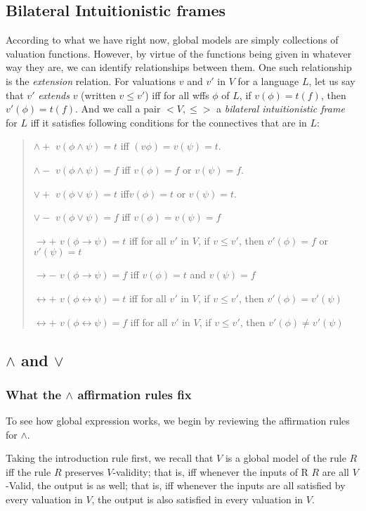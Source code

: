 \documentclass[]{article}
\begin{document}
\subsection{Bilateral Intuitionistic frames}
According to what we have right now, global models are simply collections of valuation functions. However, by virtue of the functions being given in whatever way they are, we can identify relationships between them. One such relationship is the \textit{extension} relation. For valuations $v$ and $v'$ in $V$ for a language $L$, let us say that $v'$ \textit{extends} $v$ (written $v\leq v'$) iff for all wffs $\phi$ of $L$, if $v(\phi) = t (f)$, then $v'(\phi) = t (f)$. And we call a pair $<V, \leq>$ a \textit{bilateral intuitionistic frame} for $L$ iff it satisfies following conditions for the connectives that are in $L$:

\begin{quote}
$\wedge+$ $v(\phi\wedge\psi) = t$ iff $(v\phi) = v(\psi) = t$.

$\wedge-$ $v(\phi\wedge\psi) = f$ iff $v(\phi) = f$ or $v(\psi) = f$.

$\vee+$ $v(\phi\vee\psi) = t$ iff$ v(\phi) = t$ or $v(\psi) = t$.

$\vee-$ $v(\phi\vee\psi) = f$ iff $v(\phi) = v(\psi) =f$

$\rightarrow+$ $v(\phi\rightarrow\psi) = t$ iff for all $v'$ in $V$, if $v\leq v'$, then $v'(\phi) = f$ or $v'(\psi) = t$

$\rightarrow-$ $v(\phi\rightarrow\psi) = f$ iff $v(\phi) = t$ and $v(\psi) = f$

$\leftrightarrow+$ $v(\phi\leftrightarrow\psi) = t$ iff for all $v'$ in $V$, if $v\leq v'$, then $v'(\phi) = v'(\psi)$

$\leftrightarrow+$ $v(\phi\leftrightarrow\psi) = f$ iff for all $v'$ in $V$, if $v\leq v'$, then $v'(\phi) \ne v'(\psi)$
\end{quote}
\subsection{$\wedge$ and $\vee$}
\subsubsection{What the $\wedge$ affirmation rules fix}

To see how global expression works, we begin by reviewing the affirmation rules for $\wedge$.

Taking the introduction rule first, we recall that $V$ is a global model of the rule $R$ iff the rule $R$ preserves $V$-validity; that is, iff whenever the inputs of R $R$ are all $V$-Valid, the output is as well; that is, iff whenever the inputs are all satisfied by every valuation in $V$, the output is also satisfied in every valuation in $V$.
\end{document}
